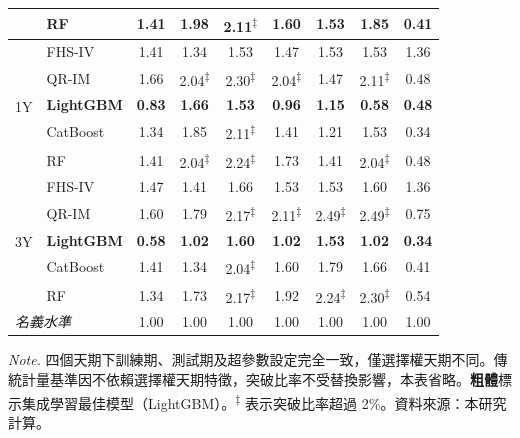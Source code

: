 \begin{table}[htbp]
{\begin{tabular}{llccccccc}
          & RF
            & 1.41 & 1.98
            & 2.11\textsuperscript{$\ddagger$}
            & 1.60 & 1.53 & 1.85 & 0.41 \\
        \hline
        \multirow{5}{*}{1Y}
          & FHS-IV
            & 1.41 & 1.34 & 1.53 & 1.47 & 1.53 & 1.53 & 1.36 \\
          & QR-IM
            & 1.66
            & 2.04\textsuperscript{$\ddagger$}
            & 2.30\textsuperscript{$\ddagger$}
            & 2.04\textsuperscript{$\ddagger$}
            & 1.47
            & 2.11\textsuperscript{$\ddagger$}
            & 0.48 \\
          & \textbf{LightGBM}
            & \textbf{0.83} & \textbf{1.66} & \textbf{1.53} & \textbf{0.96}
            & \textbf{1.15} & \textbf{0.58} & \textbf{0.48} \\
          & CatBoost
            & 1.34 & 1.85
            & 2.11\textsuperscript{$\ddagger$}
            & 1.41 & 1.21 & 1.53 & 0.34 \\
          & RF
            & 1.41
            & 2.04\textsuperscript{$\ddagger$}
            & 2.24\textsuperscript{$\ddagger$}
            & 1.73 & 1.41
            & 2.04\textsuperscript{$\ddagger$}
            & 0.48 \\
        \hline
        \multirow{5}{*}{3Y}
          & FHS-IV
            & 1.47 & 1.41 & 1.66 & 1.53 & 1.53 & 1.60 & 1.36 \\
          & QR-IM
            & 1.60 & 1.79
            & 2.17\textsuperscript{$\ddagger$}
            & 2.11\textsuperscript{$\ddagger$}
            & 2.49\textsuperscript{$\ddagger$}
            & 2.49\textsuperscript{$\ddagger$}
            & 0.75 \\
          & \textbf{LightGBM}
            & \textbf{0.58} & \textbf{1.02} & \textbf{1.60} & \textbf{1.02}
            & \textbf{1.53} & \textbf{1.02} & \textbf{0.34} \\
          & CatBoost
            & 1.41 & 1.34
            & 2.04\textsuperscript{$\ddagger$}
            & 1.60 & 1.79 & 1.66 & 0.41 \\
          & RF
            & 1.34 & 1.73
            & 2.17\textsuperscript{$\ddagger$}
            & 1.92
            & 2.24\textsuperscript{$\ddagger$}
            & 2.30\textsuperscript{$\ddagger$}
            & 0.54 \\
        \hline
        \multicolumn{2}{l}{\textit{名義水準}}
          & 1.00 & 1.00 & 1.00 & 1.00 & 1.00 & 1.00 & 1.00 \\
        \hline
    \end{tabular}}
 
    \vspace{3mm}
 
    \begin{minipage}{\textwidth}
        \fontsize{9pt}{13pt}\selectfont
        \textit{Note.} 四個天期下訓練期、測試期及超參數設定完全一致，僅選擇權天期不同。傳統計量基準因不依賴選擇權天期特徵，突破比率不受替換影響，本表省略。\textbf{粗體}標示集成學習最佳模型（LightGBM）。\textsuperscript{$\ddagger$} 表示突破比率超過 2\%。資料來源：本研究計算。
    \end{minipage}
\end{table}
